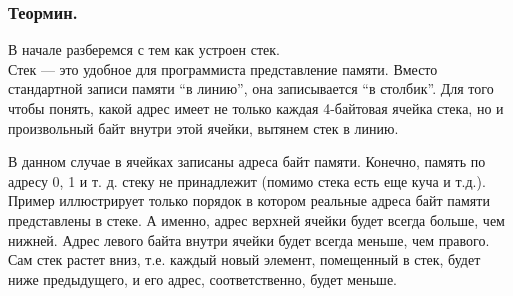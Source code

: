 \documentclass[12pt, letterpaper]{article}
\begin{document}
\subsubsection{Теормин.}
В начале разберемся с тем как устроен стек.\\
Стек — это удобное для программиста представление памяти. Вместо стандартной записи памяти ``в линию'', она записывается ``в столбик''. Для того чтобы понять, какой адрес имеет не только каждая 4-байтовая ячейка стека, но и произвольный байт внутри этой ячейки, вытянем стек в линию.\\
\par
{}
В данном случае в ячейках записаны адреса байт памяти. Конечно, память по адресу 0, 1 и т. д. стеку не принадлежит (помимо стека есть еще куча и т.д.). Пример иллюстрирует только порядок в котором реальные адреса байт памяти представлены в стеке. А именно, адрес верхней ячейки будет всегда больше, чем нижней. Адрес левого байта внутри ячейки будет всегда меньше, чем правого. Сам стек растет вниз, т.е. каждый новый элемент, помещенный в стек, будет ниже предыдущего, и его адрес, соответственно, будет меньше.\\
\end{document}
